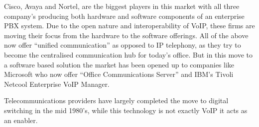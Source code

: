 Cisco, Avaya and Nortel, are the biggest players in this market with all three company's producing both hardware and software components of an enterprise PBX system. Due to the open nature and interoperability of VoIP, these firms are moving their focus from the hardware to the software offerings. All of the above now offer “unified communication” as opposed to IP telephony, as they try to become the centralised communication hub for today's office. But in this move to a software based solution the market has been opened up to companies like Microsoft who now offer “Office Communications Server”\cite{website:microsoft_enter_uc} and IBM’s Tivoli Netcool Enterprise VoIP Manager.

Telecommunications providers have largely completed the move to digital switching in the mid 1980’s\cite{TelecommsSaN05}, while this technology is not exactly VoIP it acts as an enabler.
